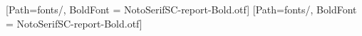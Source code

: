 %
%

[Path=fonts/,
  BoldFont = NotoSerifSC-report-Bold.otf]
[Path=fonts/,
  BoldFont = NotoSerifSC-report-Bold.otf]

%
%

